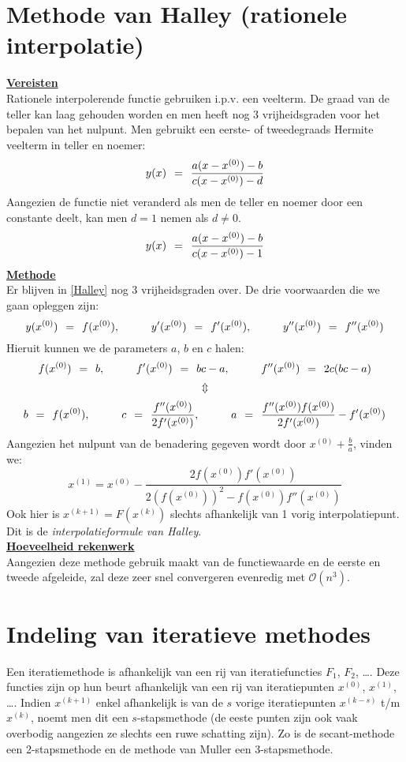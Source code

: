 \documentclass[11pt]{report}
\def \eq {\hspace{1.5mm}=\hspace{1.5mm}}
\def \H {\hspace{1cm}}
\def \v {\vspace{2mm}}
\def \updown {$$\Updownarrow$$}
\begin{document}
\section{Methode van Halley (rationele interpolatie)}
	\underline{\textbf{Vereisten}}\\
	Rationele interpolerende functie gebruiken i.p.v. een veelterm. De graad van de teller kan laag gehouden worden en men heeft nog 3 vrijheidsgraden voor het bepalen van het nulpunt. Men gebruikt een eerste- of tweedegraads Hermite veelterm in teller en noemer:
	\begin{equation}
		y(x) \eq \frac{a(x - x^{(0)}) - b}{c(x-x^{(0)}) - d}
	\end{equation}
	Aangezien de functie niet veranderd als men de teller en noemer door een constante deelt, kan men $d = 1$ nemen als $d \neq 0$.
	\begin{equation}\label{Halley}
		y(x) \eq \frac{a(x - x^{(0)}) - b}{c(x-x^{(0)}) - 1}
	\end{equation}
	\underline{\textbf{Methode}}\\
	Er blijven in \ref{Halley} nog 3 vrijheidsgraden over. De drie voorwaarden die we gaan opleggen zijn:
	$$y(x^{(0)}) \eq f(x^{(0)}), \H y'(x^{(0)}) \eq f'(x^{(0)}), \H y''(x^{(0)}) \eq f''(x^{(0)})$$
	Hieruit kunnen we de parameters $a$, $b$ en $c$ halen:
	$$f(x^{(0)}) \eq b, \H f'(x^{(0)}) \eq bc - a, \H f''(x^{(0)}) \eq 2c(bc-a)$$
	\updown
	$$b\eq f(x^{(0)}),\H c\eq \frac{f''(x^{(0)})}{2f'(x^{(0)})}, \H a \eq \frac{f''(x^{(0)})f(x^{(0)})}{2f'(x^{(0)})} - f'(x^{(0)})$$
	Aangezien het nulpunt van de benadering gegeven wordt door $x^{(0)} + \frac{b}{a}$, vinden we:
	\begin{equation}
		x^{(1)} = x^{(0)} - \frac{2f(x^{(0)})f'(x^{(0)})}{2(f(x^{(0)}))^2 - f(x^{(0)})f''(x^{(0)})}
	\end{equation}
	Ook hier is $x^{(k+1)} = F(x^{(k)})$ slechts afhankelijk van 1 vorig interpolatiepunt. Dit is de \textit{interpolatieformule van Halley}.\v\\
	\underline{\textbf{Hoeveelheid rekenwerk}}\\
	Aangezien deze methode gebruik maakt van de functiewaarde en de eerste en tweede afgeleide, zal deze zeer snel convergeren evenredig met $\mathcal{O}(n^3)$.
	
\section{Indeling van iteratieve methodes}
	Een iteratiemethode is afhankelijk van een rij van iteratiefuncties $F_1$, $F_2$, \dots. Deze functies zijn op hun beurt afhankelijk van een rij van iteratiepunten $x^{(0)}$, $x^{(1)}$, \dots. Indien $x^{(k+1)}$ enkel afhankelijk is van de $s$ vorige iteratiepunten $x^{(k-s)}$ t/m $x^{(k)}$, noemt men dit een $s$-stapsmethode (de eeste punten zijn ook vaak overbodig aangezien ze slechts een ruwe schatting zijn). Zo is de secant-methode een 2-stapsmethode en de methode van Muller een 3-stapsmethode. 
	
\end{document}
